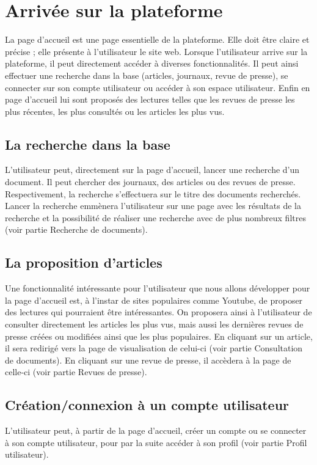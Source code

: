 \section{Arrivée sur la plateforme}
\label{sec:arrivee}

La page d’accueil est une page essentielle de la plateforme. Elle doit être claire et précise ; elle présente à l’utilisateur le site web. Lorsque l’utilisateur arrive sur la plateforme, il peut directement accéder à diverses fonctionnalités. Il peut ainsi effectuer une recherche dans la base (articles, journaux, revue de presse), se connecter sur son compte utilisateur ou accéder à son espace utilisateur. Enfin en page d'accueil lui sont proposés des lectures telles que les revues de presse les plus récentes, les plus consultés ou les articles les plus vus.

\subsection{La recherche dans la base}
\label{sec:arrivee_recherche}
L'utilisateur peut, directement sur la page d'accueil, lancer une recherche d'un document. Il peut chercher des journaux, des articles ou des revues de presse. Respectivement, la recherche s'effectuera sur le titre des documents recherchés. Lancer la recherche emmènera l'utilisateur sur une page avec les résultats de la recherche et la possibilité de réaliser une recherche avec de plus nombreux filtres (voir partie Recherche de documents).

\subsection{La proposition d’articles}
\label{sec:arrivee_article}
Une fonctionnalité intéressante pour l'utilisateur que nous allons développer pour la page d'accueil est, à l'instar de sites populaires comme Youtube, de proposer des lectures qui pourraient être intéressantes. On proposera ainsi à l'utilisateur de consulter directement les articles les plus vus, mais aussi les dernières revues de presse créées ou modifiées ainsi que les plus populaires. En cliquant sur un article, il sera redirigé vers la page de visualisation de celui-ci (voir partie Consultation de documents). En cliquant sur une revue de presse, il accèdera à la page de celle-ci (voir partie Revues de presse).

\subsection{Création/connexion à un compte utilisateur}
\label{sec:arrivee_utilisateur}
L’utilisateur peut, à partir de la page d'accueil, créer un compte ou se connecter à son compte utilisateur, pour par la suite accéder à son profil (voir partie Profil utilisateur).

